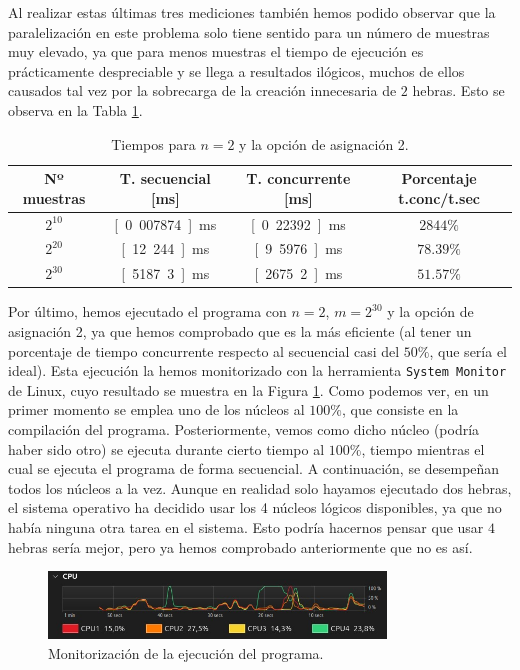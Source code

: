 \documentclass[12pt]{book}
\begin{document}
    Al realizar estas últimas tres mediciones también hemos podido observar que 
    la paralelización en este problema solo tiene sentido para un número de muestras muy elevado, ya que para
    menos muestras el tiempo de ejecución es prácticamente despreciable y se llega a resultados ilógicos, muchos de ellos causados tal vez por
    la sobrecarga de la creación innecesaria de $2$ hebras. Esto se observa en la Tabla \ref{tab:dist_num_muestras_tiempos}.
    \begin{table}
        \centering
        \begin{tabular}{|c|c|c|c|}
            \hline
            \textbf{Nº muestras} & \textbf{T. secuencial [ms]}& \textbf{T. concurrente [ms]} & \textbf{Porcentaje t.conc/t.sec} \\
            \hline
            $2^{10}$ & \unit[0.007874]{ms} & \unit[0.22392]{ms} & $2844\%$ \\
            $2^{20}$ & \unit[12.244]{ms} & \unit[9.5976]{ms} & $78.39\%$ \\
            $2^{30}$ & \unit[5187.3]{ms} & \unit[2675.2]{ms} & $51.57\%$ \\
            \hline
        \end{tabular}
        \caption{Tiempos para $n=2$ y la opción de asignación 2.}
        \label{tab:dist_num_muestras_tiempos}
    \end{table}

    Por último, hemos ejecutado el programa con $n=2$, $m=2^{30}$ y la opción de asignación 2, ya que hemos comprobado que
    es la más eficiente (al tener un porcentaje de tiempo concurrente respecto al secuencial casi del $50\%$, que sería el ideal).
    Esta ejecución la hemos monitorizado con la herramienta \verb|System Monitor| de Linux, cuyo resultado se muestra en la Figura
    \ref{fig:monitorizacion}. Como podemos ver, en un primer momento se emplea
    uno de los núcleos al $100\%$, que consiste en la
    compilación del programa. Posteriormente,
    vemos como dicho núcleo (podría haber sido otro) se ejecuta durante cierto
    tiempo al $100\%$, tiempo mientras el cual se ejecuta el programa de forma secuencial.
    A continuación, se desempeñan todos los núcleos a la vez. Aunque en realidad solo hayamos ejecutado dos hebras, el sistema operativo
    ha decidido usar los 4 núcleos lógicos disponibles, ya que no había ninguna otra tarea en el sistema. Esto podría hacernos pensar que usar $4$ hebras sería mejor,
    pero ya hemos comprobado anteriormente que no es así.
    \begin{figure}
        \centering
        \includegraphics[width=0.8\textwidth]{./Seminario1/Imágenes/S1_SystemMonitor.jpg}
        \caption{Monitorización de la ejecución del programa.}
        \label{fig:monitorizacion}
    \end{figure}
\end{document}
